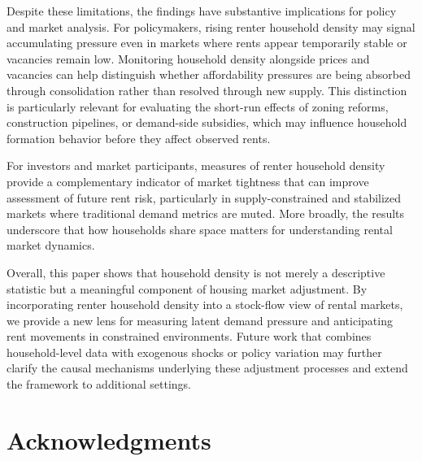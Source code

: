 \documentclass[pdflatex,sn-apa]{sn-jnl}%
\theoremstyle{thmstyleone}%
\theoremstyle{thmstyletwo}%
\theoremstyle{thmstylethree}%
\begin{document}
Despite these limitations, the findings have substantive implications for policy and
market analysis. For policymakers, rising renter household density may signal
accumulating pressure even in markets where rents appear temporarily stable or
vacancies remain low. Monitoring household density alongside prices and vacancies can
help distinguish whether affordability pressures are being absorbed through
consolidation rather than resolved through new supply. This distinction is particularly
relevant for evaluating the short-run effects of zoning reforms, construction pipelines,
or demand-side subsidies, which may influence household formation behavior before
they affect observed rents.

For investors and market participants, measures of renter household density provide a
complementary indicator of market tightness that can improve assessment of future rent
risk, particularly in supply-constrained and stabilized markets where traditional demand
metrics are muted. More broadly, the results underscore that how households share space
matters for understanding rental market dynamics.

Overall, this paper shows that household density is not merely a descriptive statistic
but a meaningful component of housing market adjustment. By incorporating renter
household density into a stock-flow view of rental markets, we provide a new lens for
measuring latent demand pressure and anticipating rent movements in constrained
environments. Future work that combines household-level data with exogenous shocks
or policy variation may further clarify the causal mechanisms underlying these
adjustment processes and extend the framework to additional settings.


\backmatter
\clearpage
\section*{Acknowledgments}
\end{document}
